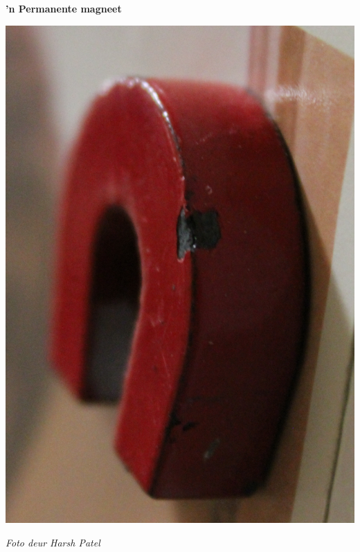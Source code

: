 \begin{minipage}{.3\textwidth}
\begin{center}
\textbf{'n Permanente magneet}\par
 \includegraphics[width=.8\textwidth]{photos/HarshPatelPhotographer.jpg}\par
\textit{Foto deur Harsh Patel}
\end{center}
\end{minipage}
